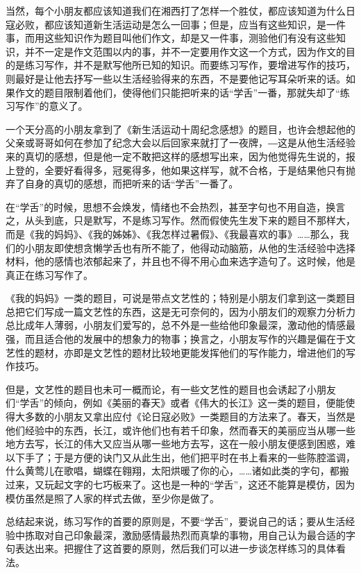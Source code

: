 \documentclass[12pt,a5paper]{ctexbook}
\begin{document}
当然，每个小朋友都应该知道我们在湘西打了怎样一个胜仗，都应该知道为什么日寇必败，都应该知道新生活运动是怎么一回事；但是，应当有这些知识，是一件事，而用这些知识作为题目叫他们作文，却是又一件事，测验他们有没有这些知识，并不一定是作文范围以内的事，并不一定要用作文这一个方式，因为作文的目的是练习写作，并不是默写他所已知的知识。而要练习写作，要增进写作的技巧，则最好是让他去抒写一些以生活经验得来的东西，不是要他记写耳朵听来的话。如果作文的题目限制着他们，使得他们只能把听来的话“学舌”一番，那就失却了“练习写作”的意义了。

一个天分高的小朋友拿到了《新生活运动十周纪念感想》的题目，也许会想起他的父亲或哥哥如何在参加了纪念大会以后回家来就打了一夜牌，―这是从他生活经验来的真切的感想，但是他一定不敢把这样的感想写出来，因为他觉得先生说的，报上登的，全要好看得多，冠冕得多，他如果这样写，就不合格，于是结果他只有抛弃了自身的真切的感想，而把听来的话“学舌”一番了。

在“学舌”的时候，思想不会焕发，情绪也不会热烈，甚至字句也不用自造，换言之，从头到底，只是默写，不是练习写作。然而假使先生发下来的题目不那样大，而是《我的妈妈》、《我的姊姊》、《我怎样过暑假》、《我最喜欢的事》……那么，我们的小朋友即使想贪懒学舌也有所不能了，他得动动脑筋，从他的生活经验中选择材料，他的感情也浓郁起来了，并且也不得不用心血来选字造句了。这时候，他是真正在练习写作了。

《我的妈妈》一类的题目，可说是带点文艺性的；特别是小朋友们拿到这一类题目总把它们写成一篇文艺性的东西，这是无可奈何的，因为小朋友们的观察力分析力总比成年人薄弱，小朋友们爱写的，总不外是一些给他印象最深，激动他的情感最强，而且适合他的发展中的想象力的物事；换言之，小朋友写作的兴趣是偏在于文艺性的题材，亦即是文艺性的题材比较地更能发挥他们的写作能力，增进他们的写作技巧。

但是，文艺性的题目也未可一概而论，有一些文艺性的题目也会诱起了小朋友们“学舌”的倾向，例如《美丽的春天》或者《伟大的长江》这一类的题目，便能使得大多数的小朋友又拿出应付《论日寇必败》一类题目的方法来了。春天，当然是他们经验中的东西，长江，或许他们也有若千印象，然而春天的美丽应当从哪一些地方去写，长江的伟大又应当从哪一些地方去写，这在一般小朋友便感到困惑，难以下手了；于是方便的诀门又从此生出，他们把平时在书上看来的一些陈腔滥调，什么黄莺儿在歌唱，蝴蝶在翱翔，太阳烘暖了你的心，……诸如此类的字句，都搬过来，又玩起文字的七巧板来了。这也是一种的“学舌”，这还不能算是模仿，因为模仿虽然是照了人家的样式去做，至少你是做了。

总结起来说，练习写作的首要的原则是，不要“学舌”，要说自己的话；要从生活经验中拣取对自己印象最深，激励感情最热烈而真挚的事物，用自己认为最合适的字句表达出来。把握住了这首要的原则，然后我们可以进一步谈怎样练习的具体看法。
\end{document}
